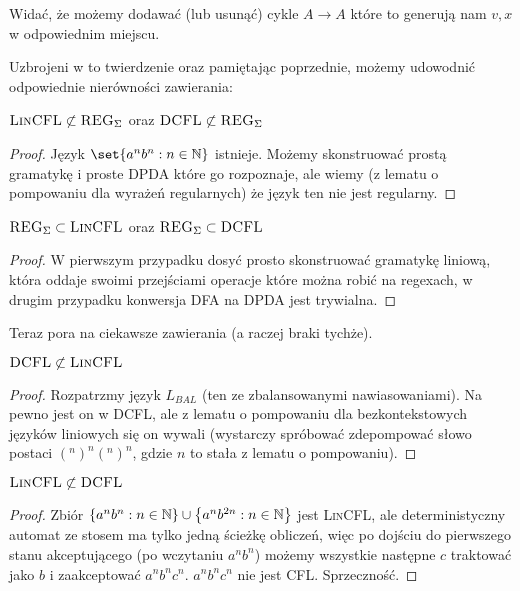 Widać, że możemy dodawać (lub usunąć) cykle \(A \rightarrow A\) które to generują nam \(v, x\) w odpowiednim miejscu.

Uzbrojeni w to twierdzenie oraz pamiętając poprzednie, możemy udowodnić odpowiednie nierówności zawierania:

\begin{theorem}
	\(\textsc{LinCFL} \not \subset \textsc{REG}_\Sigma \) oraz \(\textsc{DCFL} \not \subset \textsc{REG}_\Sigma\)
\end{theorem}

\begin{proof}
	Język \( \set{a^nb^n : n\in \natural} \) istnieje. Możemy skonstruować prostą gramatykę i proste DPDA które go rozpoznaje, ale wiemy (z lematu o pompowaniu dla wyrażeń regularnych) że język ten nie jest regularny.
\end{proof}

\begin{theorem}
	\( \textsc{REG}_\Sigma \subset \textsc{LinCFL} \) oraz \( \textsc{REG}_\Sigma \subset \textsc{DCFL}\)
\end{theorem}

\begin{proof}
	W pierwszym przypadku dosyć prosto skonstruować gramatykę liniową, która oddaje swoimi przejściami operacje które można robić na regexach, w drugim przypadku konwersja DFA na DPDA jest trywialna.
\end{proof}

Teraz pora na ciekawsze zawierania (a raczej braki tychże).

\begin{theorem}
	\( \textsc{DCFL} \not \subset \textsc{LinCFL} \)
\end{theorem}

\begin{proof}
	Rozpatrzmy język \(L_{BAL}\) (ten ze zbalansowanymi nawiasowaniami). Na pewno jest on w DCFL, ale z lematu o pompowaniu dla bezkontekstowych języków liniowych się on wywali (wystarczy spróbować zdepompować słowo postaci \( (^n)^n(^n)^n \), gdzie \(n\) to stała z lematu o pompowaniu).
\end{proof}

\begin{theorem}
	\( \textsc{LinCFL} \not \subset \textsc{DCFL} \)
\end{theorem}
\begin{proof}
	Zbiór \(\left\{a^nb^n: n \in \mathbb{N}\right\} \cup \left\{a^nb^{2n}:n\in\mathbb{N}\right\}\) jest \textsc{LinCFL},
	ale deterministyczny automat ze stosem ma tylko jedną ścieżkę obliczeń, więc po dojściu do pierwszego stanu akceptującego (po wczytaniu \(a^nb^n\)) możemy wszystkie następne \(c\) traktować jako \(b\) i zaakceptować \(a^nb^nc^n\). \(a^nb^nc^n\) nie jest \textsc{CFL}. Sprzeczność.
\end{proof}

